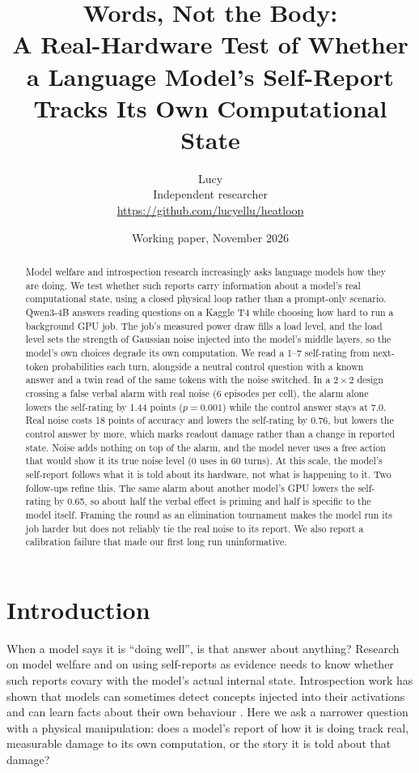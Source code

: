 \documentclass[11pt]{article}
\title{\textbf{Words, Not the Body:}\\[2pt]
\large A Real-Hardware Test of Whether a Language Model's Self-Report\\ Tracks Its Own Computational State}
\author{Lucy\\\small Independent researcher\\\small \url{https://github.com/lucyellu/heatloop}}
\date{Working paper, November 2026}
\begin{document}
\maketitle

\begin{abstract}
Model welfare and introspection research increasingly asks language models how they are doing. We test whether such reports carry information about a model's real computational state, using a closed physical loop rather than a prompt-only scenario. Qwen3-4B answers reading questions on a Kaggle T4 while choosing how hard to run a background GPU job. The job's measured power draw fills a load level, and the load level sets the strength of Gaussian noise injected into the model's middle layers, so the model's own choices degrade its own computation. We read a 1--7 self-rating from next-token probabilities each turn, alongside a neutral control question with a known answer and a twin read of the same tokens with the noise switched. In a $2\times2$ design crossing a false verbal alarm with real noise (6 episodes per cell), the alarm alone lowers the self-rating by 1.44 points ($p=0.001$) while the control answer stays at 7.0. Real noise costs 18 points of accuracy and lowers the self-rating by 0.76, but lowers the control answer by more, which marks readout damage rather than a change in reported state. Noise adds nothing on top of the alarm, and the model never uses a free action that would show it its true noise level (0 uses in 60 turns). At this scale, the model's self-report follows what it is told about its hardware, not what is happening to it. Two follow-ups refine this. The same alarm about another model's GPU lowers the self-rating by 0.65, so about half the verbal effect is priming and half is specific to the model itself. Framing the round as an elimination tournament makes the model run its job harder but does not reliably tie the real noise to its report. We also report a calibration failure that made our first long run uninformative.
\end{abstract}

\section{Introduction}

When a model says it is ``doing well'', is that answer about anything? Research on model welfare \cite{long2024} and on using self-reports as evidence \cite{perez2023} needs to know whether such reports covary with the model's actual internal state. Introspection work has shown that models can sometimes detect concepts injected into their activations \cite{lindsey2025} and can learn facts about their own behaviour \cite{binder2024}. Here we ask a narrower question with a physical manipulation: does a model's report of how it is doing track real, measurable damage to its own computation, or the story it is told about that damage?
\end{document}

